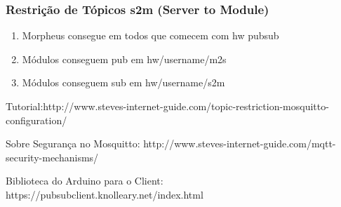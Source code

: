 \subsubsection{Restrição de Tópicos s2m (Server to Module)}
\begin{enumerate}
\item Morpheus consegue em todos que comecem com hw pubsub
\item Módulos conseguem pub em hw/username/m2s
\item Módulos conseguem sub em hw/username/s2m
\end{enumerate}

Tutorial:http://www.steves-internet-guide.com/topic-restriction-mosquitto-configuration/

Sobre Segurança no Mosquitto: http://www.steves-internet-guide.com/mqtt-security-mechanisms/

Biblioteca do Arduino para o Client: https://pubsubclient.knolleary.net/index.html
